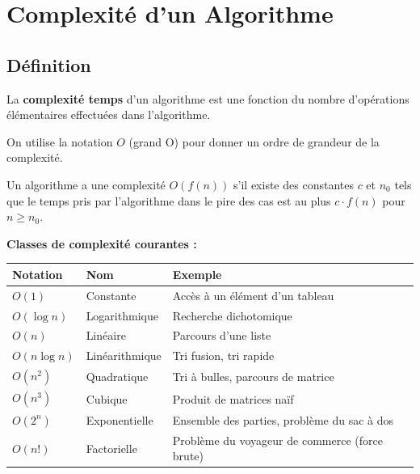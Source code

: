\documentclass[12pt,a4paper]{article}
\begin{document}
\newpage
\section{Complexité d'un Algorithme}

\subsection{Définition}

\begin{definition}
La \textcolor{titrebleu}{\textbf{complexité temps}} d'un algorithme est une fonction du nombre d'opérations élémentaires effectuées dans l'algorithme.

On utilise la notation \textcolor{defvert}{\textbf{$O$}} (grand O) pour donner un ordre de grandeur de la complexité.
\end{definition}

\begin{definition}
Un algorithme a une complexité $O(f(n))$ s'il existe des constantes $c$ et $n_0$ tels que le temps pris par l'algorithme dans le pire des cas est au plus $c \cdot f(n)$ pour $n \geq n_0$.
\end{definition}

\begin{notecours}
\textbf{Classes de complexité courantes :}

\begin{tabular}{|l|l|l|}
\hline
\textbf{Notation} & \textbf{Nom} & \textbf{Exemple} \\
\hline
$O(1)$ & Constante & Accès à un élément d'un tableau \\
$O(\log n)$ & Logarithmique & Recherche dichotomique \\
$O(n)$ & Linéaire & Parcours d'une liste \\
$O(n \log n)$ & Linéarithmique & Tri fusion, tri rapide \\
$O(n^2)$ & Quadratique & Tri à bulles, parcours de matrice \\
$O(n^3)$ & Cubique & Produit de matrices naïf \\
$O(2^n)$ & Exponentielle & Ensemble des parties, problème du sac à dos \\
$O(n!)$ & Factorielle & Problème du voyageur de commerce (force brute) \\
\hline
\end{tabular}
\end{notecours}
\end{document}
